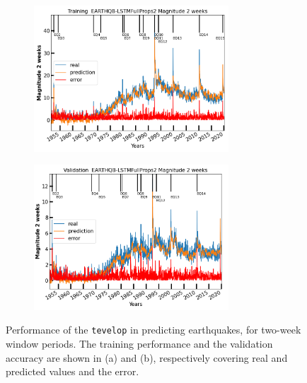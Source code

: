 \begin{figure}[!htb]
    \begin{subfigure}{0.49\textwidth}
    \centering
    \includegraphics[width=0.8\textwidth]{images/earthquake/image10a.png}
    \caption{}
    \label{fig:tevelop-training}
    \end{subfigure}
    \hfill
    \begin{subfigure}{0.49\textwidth}
    \centering
    \includegraphics[width=0.8\textwidth]{images/earthquake/image10b.png}
    \caption{}
    \label{fig:tevelop-validation}
    \end{subfigure}
    \caption{Performance of the {\tt tevelop} in predicting earthquakes, for two-week window periods.  The training performance  and the validation accuracy are shown in (a) and (b), respectively covering real and predicted values and the error.}
    \label{fig:eq-2weeks}
\end{figure}


